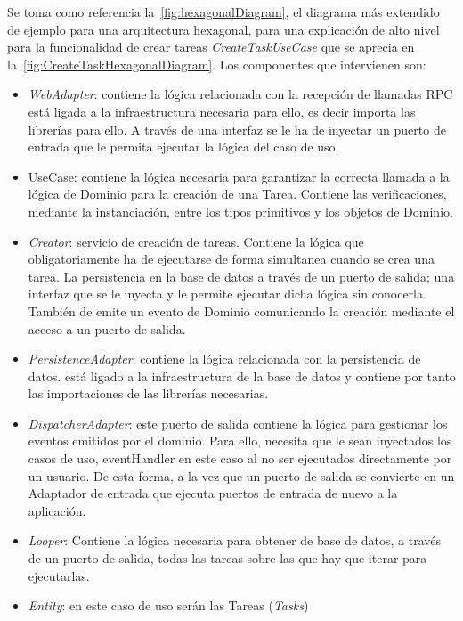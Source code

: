 
Se toma como referencia la~\cref{fig:hexagonalDiagram}, el diagrama más extendido de ejemplo para una arquitectura hexagonal, para una explicación de alto nivel para la funcionalidad de crear tareas \textit{CreateTaskUseCase} que se aprecia en la~\cref{fig:CreateTaskHexagonalDiagram}.
Los componentes que intervienen son:
\begin{itemize}
    \item \textit{WebAdapter}: contiene la lógica relacionada con la recepción de llamadas RPC está ligada a la infraestructura necesaria para ello, es decir importa las librerías para ello.
    A través de una interfaz se le ha de inyectar un puerto de entrada que le permita ejecutar la lógica del caso de uso.
    \item UseCase: contiene la lógica necesaria para garantizar la correcta llamada a la lógica de Dominio para la creación de una Tarea.
    Contiene las verificaciones, mediante la instanciación, entre los tipos primitivos y los objetos de Dominio.
    \item \textit{Creator}: servicio de creación de tareas.
    Contiene la lógica que obligatoriamente ha de ejecutarse de forma simultanea cuando se crea una tarea.
    La persistencia en la base de datos a través de un puerto de salida; una interfaz que se le inyecta y le permite ejecutar dicha lógica sin conocerla.
    También de emite un evento de Dominio comunicando la creación mediante el acceso a un puerto de salida.
    \item \textit{PersistenceAdapter}: contiene la lógica relacionada con la persistencia de datos.
    está ligado a la infraestructura de la base de datos y contiene por tanto las importaciones de las librerías necesarias.
    \item \textit{DispatcherAdapter}: este puerto de salida contiene la lógica para gestionar los eventos emitidos por el dominio.
    Para ello, necesita que le sean inyectados los casos de uso, eventHandler en este caso al no ser ejecutados directamente por un usuario.
    De esta forma, a la vez que un puerto de salida se convierte en un Adaptador de entrada que ejecuta puertos de entrada de nuevo a la aplicación.
    \item \textit{Looper}: Contiene la lógica necesaria para obtener de base de datos, a través de un puerto de salida, todas las tareas sobre las que hay que iterar para ejecutarlas.
    \item \textit{Entity}: en este caso de uso serán las Tareas (\textit{Tasks})
\end{itemize}

